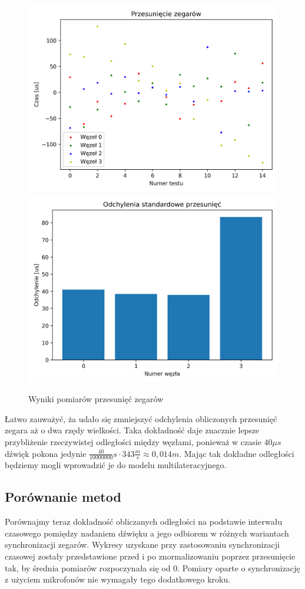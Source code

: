 \begin{figure}[h]
\centering
    \includegraphics[width=.49\textwidth]{pics/mic_sync/offsets.png}
    \includegraphics[width=.49\textwidth]{pics/mic_sync/stddev_offsets.png}
\caption{Wyniki pomiarów przesunięć zegarów}
\label{pic:mic_sync}
\end{figure}

Łatwo zauważyć, ża udało się zmniejszyć odchylenia obliczonych przesunięć zegara aż o dwa rzędy wielkości. Taka dokładność daje znacznie lepsze przybliżenie rzeczywistej odległości między węzłami, ponieważ w czasie $40 \mu s$ dźwięk pokona jedynie $\frac{40}{10000000}s \cdot 343 \frac{m}{s} \approx 0,014m$. Mając tak dokładne odległości będziemy mogli wprowadzić je do modelu multilateracyjnego.

\subsection{Porównanie metod}

Porównajmy teraz dokładność obliczanych odległości na podstawie interwału czasowego pomiędzy nadaniem dźwięku a jego odbiorem w różnych wariantach synchronizacji zegarów. Wykresy uzyskane przy zastosowaniu synchronizacji czasowej zostały przedstawione przed i po znormalizowaniu poprzez przesunięcie tak, by średnia pomiarów rozpoczynała się od 0. Pomiary oparte o synchronizację z użyciem mikrofonów nie wymagały tego dodatkowego kroku.

